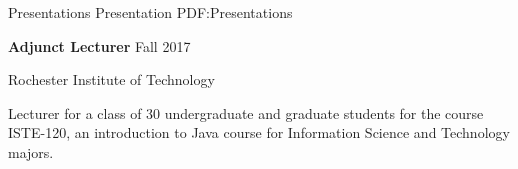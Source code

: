\documentclass[MMMMyyyy,nonstopmode]{simpleresumecv_stacked}
\begin{document}
\begin{Body}

 %
\fi %

\iffalse %
\Section
{Certifications}
{Certifications}
{PDF:Certifications}

\Entry
\href{https://www.appdynamics.com/certifications/}
{\textbf{AppDynamics Certified Implementations Professional}}
\hfill
\DatestampYM{2016}{11}

\fi %



\newif\ifA
\newif\ifB
\newif\ifC
\Afalse
\Bfalse
\Cfalse
\ifA

\Section
{Presentations}%
{Presentation}%
{PDF:Presentations}%

\iffalse      %
\Entry
\textbf{Adjunct Lecturer}
\hfill
Fall 2017

Rochester Institute of Technology
\begin{Detail}
\Item
Lecturer for a class of 30 undergraduate and graduate students for the course ISTE-120, an introduction to Java course for Information Science and Technology majors.
\end{Detail}


\end{Body}
\end{document}
